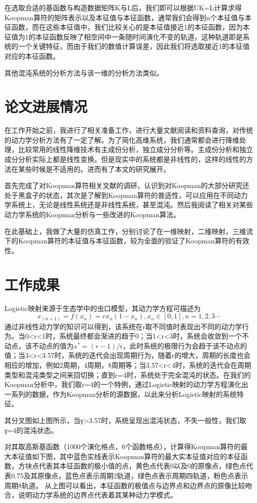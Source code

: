在选取合适的基函数与构造数据矩阵K与L后，我们即可以根据UK=L计算求得Koopman算符的矩阵表示以及本征值与本征函数，通常我们会得到n个本征值与本征函数，而在这些本征值中，我们比较关心的是本征值接近1的本征函数，因为本征值为1的本征函数反映了相空间中一条随时间演化不变的轨道，这种轨道即是系统的一个关键特征，而由于我们的数值计算误差，因此我们将选取接近1的本征值对应的本征函数。

其他混沌系统的分析方法与该一维的分析方法类似。

\section{论文进展情况}
在工作开始之前，我进行了相关准备工作，进行大量文献阅读和资料查询，对传统的动力学分析方法有了一定了解。为了简化高维系统，我们通常都会进行降维处理，比较常用的线性降维技术有主成份分析，独立成分分析等。主成份分析和独立成分分析实际上都是线性变换。但是现实中的系统都是非线性的，这样的线性的方法在某些时候是不适用的。进而有了本文的研究展开。

首先完成了对Koopman算符相关文献的调研，认识到对Koopman的大部分研究还处于黑盒子的状态，其次是了解到Koopman算符的普适性，可以应用在不同动力学系统上，无论是线性系统还是非线性系统，甚至混沌。然后我阅读了相关对某些动力学系统的Koopman分析与一些改进的Koopman算法。

在此基础上，我做了大量的仿真工作，分别讨论了在一维映射，二维映射，三维流下的Koopman算符的本征值与本征函数，较为全面的验证了Koopman算符的有效性。

\section{工作成果}
Logistic映射来源于生态学中的虫口模型，其动力学方程可描述为
$$x_(n+1)=f(x_n )=rx_n (1-x_n ),x_n∈[0,1],n=1,2,3⋯$$
通过非线性动力学的知识可以得到，该系统在r取不同值时表现出不同的动力学行为。当0<r<1时，系统最终都会渐进的趋于0；当1<r<3时，系统会收敛到一个不动点，该不动点的值为$x^*=(r-1)/$r，此时系统的极限行为会趋于该不动点的值；当3<r<3.57时，系统的迭代会出现周期行为，随着r的增大，周期的长度也会相应的增加，例如2周期，4周期，8周期等；当3.57<r<4时，系统的迭代会在周期类型和混沌类型之间来回切换；直到r=4时，系统处于完全混沌的状态。在我们的Koopman分析中，我们取r=4的一个特例，通过Logistic映射的动力学方程演化出一系列的数据，作为Koopman分析的源数据，以此来分析Logistic映射的系统特征。
  
其分叉图如上图所示，当γ>3.57时，系统呈现出混沌状态，不失一般性，我们取γ=4的混沌状态。
 
对其取高斯基函数（1000个演化格点，6个函数格点），计算得Koopman算符的最大本征值如下图，其中蓝色实线表示Koopman算符的最大实本征值对应的本征函数，方块点代表其本征函数的极小值的点，黄色点代表0以及0的原像点，绿色点代表0.75及其原像点，蓝色点表示周期2轨道，绿色点表示周期四轨道，粉色点表示周期8轨道。
从上图可以看出，本征函数的极值点与边界点和边界点的原像比较吻合，说明动力学系统的边界点代表着其某种动力学模式。
 
